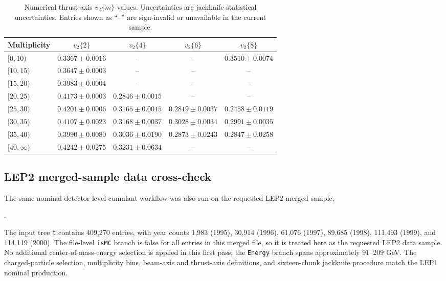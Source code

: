 \documentclass{article}
\newcommand{\vn}[2]{\ensuremath{v_{#1}\{#2\}}}
\begin{document}
\begin{table}[htbp]
\centering
\small
\caption{Numerical thrust-axis \(\vn{2}{m}\) values. Uncertainties are
jackknife statistical uncertainties. Entries shown as ``--'' are sign-invalid
or unavailable in the current sample.}
\label{tab:thrust-results}
\begin{tabular}{lcccc}
\toprule
Multiplicity & \(\vn{2}{2}\) & \(\vn{2}{4}\) & \(\vn{2}{6}\) & \(\vn{2}{8}\) \\
\midrule
\([0,10)\) & \(0.3367\pm0.0016\) & -- & -- & \(0.3510\pm0.0074\) \\
\([10,15)\) & \(0.3647\pm0.0003\) & -- & -- & -- \\
\([15,20)\) & \(0.3983\pm0.0004\) & -- & -- & -- \\
\([20,25)\) & \(0.4173\pm0.0003\) & \(0.2846\pm0.0015\) & -- & -- \\
\([25,30)\) & \(0.4201\pm0.0006\) & \(0.3165\pm0.0015\) & \(0.2819\pm0.0037\) & \(0.2458\pm0.0119\) \\
\([30,35)\) & \(0.4107\pm0.0023\) & \(0.3168\pm0.0037\) & \(0.3028\pm0.0034\) & \(0.2991\pm0.0035\) \\
\([35,40)\) & \(0.3990\pm0.0080\) & \(0.3036\pm0.0190\) & \(0.2873\pm0.0243\) & \(0.2847\pm0.0258\) \\
\([40,\infty)\) & \(0.4242\pm0.0275\) & \(0.3231\pm0.0634\) & -- & -- \\
\bottomrule
\end{tabular}
\end{table}


\subsection{LEP2 merged-sample data cross-check}
\label{subsec:lep2-data-cross-check}

The same nominal detector-level cumulant workflow was also run on the requested
LEP2 merged sample,
\begin{center}
.
\end{center}
The input tree \texttt{t} contains 409,270 entries, with year counts 1,983
(1995), 30,914 (1996), 61,076 (1997), 89,685 (1998), 111,493 (1999), and
114,119 (2000). The file-level \texttt{isMC} branch is false for all entries in
this merged file, so it is treated here as the requested LEP2 data sample. No
additional center-of-mass-energy selection is applied in this first pass; the
\texttt{Energy} branch spans approximately 91--209 GeV. The charged-particle
selection, multiplicity bins, beam-axis and thrust-axis definitions, and
sixteen-chunk jackknife procedure match the LEP1 nominal production.
\end{document}
